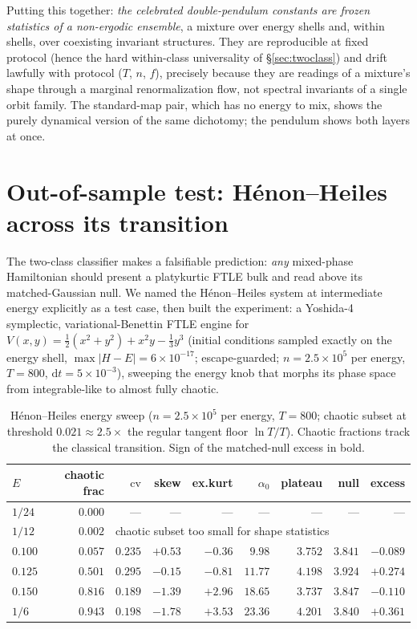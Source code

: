 \documentclass[11pt,a4paper]{article}
\theoremstyle{remark}
\newcommand{\cv}{\mathrm{cv}}
\begin{document}
Putting this together: \emph{the celebrated double-pendulum constants are frozen statistics of a
non-ergodic ensemble}, a mixture over energy shells and, within shells, over coexisting invariant
structures. They are reproducible at fixed protocol (hence the hard within-class universality of
\S\ref{sec:twoclass}) and drift lawfully with protocol ($T$, $n$, $f$), precisely because they are
readings of a mixture's shape through a marginal renormalization flow, not spectral invariants of a
single orbit family. The standard-map pair, which has no energy to mix, shows the purely dynamical
version of the same dichotomy; the pendulum shows both layers at once.

\section{Out-of-sample test: H\'enon--Heiles across its transition}\label{sec:hh}

The two-class classifier makes a falsifiable prediction: \emph{any} mixed-phase Hamiltonian should
present a platykurtic FTLE bulk and read above its matched-Gaussian null. We named the
H\'enon--Heiles system \cite{henonheiles} at intermediate energy explicitly as a test case, then
built the experiment: a Yoshida-4 symplectic, variational-Benettin FTLE engine for
$V(x,y) = \tfrac12(x^2{+}y^2) + x^2y - \tfrac13 y^3$ (initial conditions sampled exactly on the
energy shell, $\max|H - E| = 6\times10^{-17}$; escape-guarded; $n = 2.5\times10^{5}$ per energy,
$T = 800$, $\mathrm{d}t = 5\times10^{-3}$), sweeping the energy knob that morphs its phase space from
integrable-like to almost fully chaotic.

\begin{table}[t]
\centering\small
\caption{H\'enon--Heiles energy sweep ($n = 2.5\times10^{5}$ per energy, $T = 800$; chaotic subset
at threshold $0.021 \approx 2.5\times$ the regular tangent floor $\ln T/T$). Chaotic fractions
track the classical transition. Sign of the matched-null excess in bold.}
\label{tab:hh}
\begin{tabular}{lrrrrrrrr}
\toprule
$E$ & chaotic frac & $\cv$ & skew & ex.kurt & $\alpha_0$ & plateau & null & excess\\
\midrule
$1/24$ & $0.000$ & --- & --- & --- & --- & --- & --- & ---\\
$1/12$ & $0.002$ & \multicolumn{7}{l}{\footnotesize chaotic subset too small for shape statistics}\\
$0.100$ & $0.057$ & $0.235$ & $+0.53$ & $-0.36$ & $9.98$ & $3.752$ & $3.841$ & $\mathbf{-0.089}$\\
$0.125$ & $0.501$ & $0.295$ & $-0.15$ & $-0.81$ & $11.77$ & $4.198$ & $3.924$ & $\mathbf{+0.274}$\\
$0.150$ & $0.816$ & $0.189$ & $-1.39$ & $+2.96$ & $18.65$ & $3.737$ & $3.847$ & $\mathbf{-0.110}$\\
$1/6$   & $0.943$ & $0.198$ & $-1.78$ & $+3.53$ & $23.36$ & $4.201$ & $3.840$ & $\mathbf{+0.361}$\\
\bottomrule
\end{tabular}
\end{table}
\end{document}
